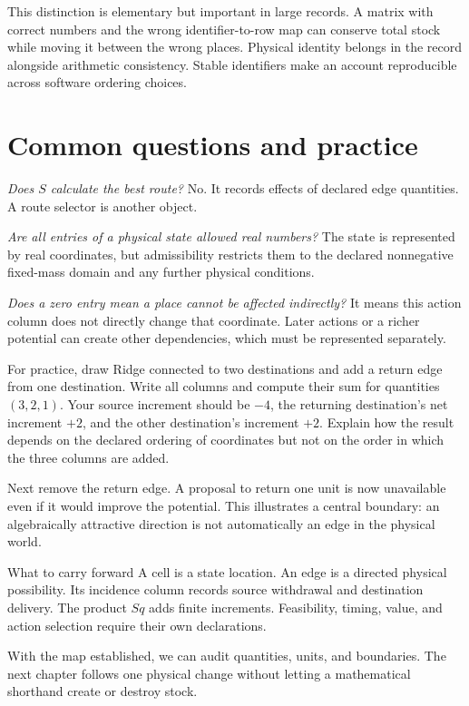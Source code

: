 This distinction is elementary but important in large records. A matrix with correct numbers and the wrong identifier-to-row map can conserve total stock while moving it between the wrong places. Physical identity belongs in the record alongside arithmetic consistency. Stable identifiers make an account reproducible across software ordering choices.

\section{Common questions and practice}
\emph{Does \(S\) calculate the best route?} No. It records effects of declared edge quantities. A route selector is another object.

\emph{Are all entries of a physical state allowed real numbers?} The state is represented by real coordinates, but admissibility restricts them to the declared nonnegative fixed-mass domain and any further physical conditions.

\emph{Does a zero entry mean a place cannot be affected indirectly?} It means this action column does not directly change that coordinate. Later actions or a richer potential can create other dependencies, which must be represented separately.

For practice, draw Ridge connected to two destinations and add a return edge from one destination. Write all columns and compute their sum for quantities \((3,2,1)\). Your source increment should be \(-4\), the returning destination's net increment \(+2\), and the other destination's increment \(+2\). Explain how the result depends on the declared ordering of coordinates but not on the order in which the three columns are added.

Next remove the return edge. A proposal to return one unit is now unavailable even if it would improve the potential. This illustrates a central boundary: an algebraically attractive direction is not automatically an edge in the physical world.

\begin{intuitionbox}{What to carry forward}
A cell is a state location. An edge is a directed physical possibility. Its incidence column records source withdrawal and destination delivery. The product \(Sq\) adds finite increments. Feasibility, timing, value, and action selection require their own declarations.
\end{intuitionbox}

With the map established, we can audit quantities, units, and boundaries. The next chapter follows one physical change without letting a mathematical shorthand create or destroy stock.
